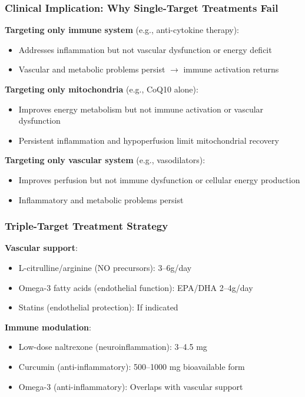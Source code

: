 \subsubsection{Clinical Implication: Why Single-Target Treatments Fail}

\textbf{Targeting only immune system} (e.g., anti-cytokine therapy):
\begin{itemize}
    \item Addresses inflammation but not vascular dysfunction or energy deficit
    \item Vascular and metabolic problems persist $\rightarrow$ immune activation returns
\end{itemize}

\textbf{Targeting only mitochondria} (e.g., CoQ10 alone):
\begin{itemize}
    \item Improves energy metabolism but not immune activation or vascular dysfunction
    \item Persistent inflammation and hypoperfusion limit mitochondrial recovery
\end{itemize}

\textbf{Targeting only vascular system} (e.g., vasodilators):
\begin{itemize}
    \item Improves perfusion but not immune dysfunction or cellular energy production
    \item Inflammatory and metabolic problems persist
\end{itemize}

\subsubsection{Triple-Target Treatment Strategy}

\textbf{Vascular support}:
\begin{itemize}
    \item L-citrulline/arginine (NO precursors): 3--6g/day
    \item Omega-3 fatty acids (endothelial function): EPA/DHA 2--4g/day
    \item Statins (endothelial protection): If indicated
\end{itemize}

\textbf{Immune modulation}:
\begin{itemize}
    \item Low-dose naltrexone (neuroinflammation): 3--4.5 mg
    \item Curcumin (anti-inflammatory): 500--1000 mg bioavailable form
    \item Omega-3 (anti-inflammatory): Overlaps with vascular support
\end{itemize}

